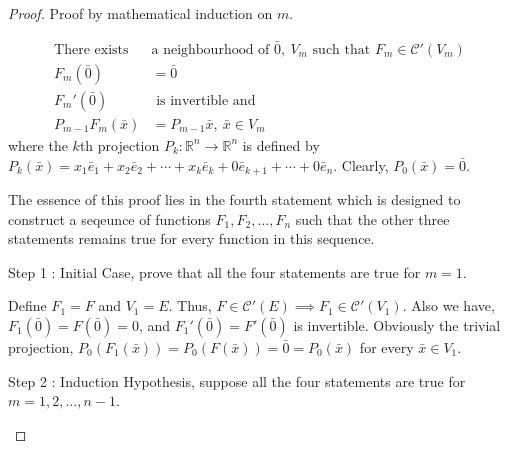 \begin{proof}
Proof by mathematical induction on $m$.
\begin{commentary}
\begin{align}
	\text{There exists } & \text{a neighbourhood of } \bar{0},\ V_m  \text{ such that } F_m \in \mathscr{C}'(V_m)\\
	F_m(\bar{0}) & = \bar{0}\\
	F_m'(\bar{0}) & \text{ is invertible and }\\
	P_{m-1}F_m(\bar{x}) & = P_{m-1}\bar{x},\ \bar{x} \in V_m
\end{align}
	where the $k$th projection $P_k : \mathbb{R}^n \to \mathbb{R}^n$ is defined by $P_k(\bar{x}) = x_1\bar{e}_1 + x_2\bar{e}_2 + \dotsb + x_k\bar{e}_k + 0\bar{e}_{k+1} + \dotsb + 0\bar{e}_n$.
Clearly, $P_0(\bar{x}) = \bar{0}$.

	The essence of this proof lies in the fourth statement which is designed to construct a seqeunce of functions $F_1,F_2,\dots,F_n$ such that the other three statements remains true for every function in this sequence.\\
\end{commentary}

\begin{commentary}Step 1 : Initial Case, prove that all the four statements are true for $m = 1$.\end{commentary}

Define $F_1 = F$ and $V_1 = E$.
Thus, $F \in \mathscr{C}'(E) \implies F_1 \in \mathscr{C}'(V_1)$.
Also we have, $F_1(\bar{0}) = F(\bar{0}) = 0$, and $F_1'(\bar{0}) = F'(\bar{0})$ is invertible.
Obviously the trivial projection, $P_0(F_1(\bar{x})) = P_0(F(\bar{x})) = \bar{0} = P_0(\bar{x})$ for every $\bar{x} \in V_1$.\\
\begin{commentary}Step 2 : Induction Hypothesis, suppose all the four statements are true for $m = 1,2,\dots,n-1$.\end{commentary}


\end{proof}
